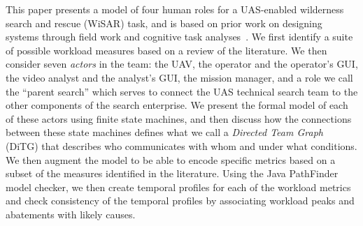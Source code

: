 This paper presents a model of four human roles for a UAS-enabled wilderness search and rescue (WiSAR) task, and is based on prior work on designing systems through field work and cognitive task analyses~\cite{Adams2008,GoodrichMorse2008}.  We first identify a suite of possible workload measures based on a review of the literature.  We then consider seven {\em actors} in the team: the UAV, the operator and the operator's GUI, the video analyst and the analyst's GUI, the mission manager, and a role we call the ``parent search'' which serves to connect the UAS technical search team to the other components of the search enterprise.  We present the formal model of each of these actors using finite state machines, and then discuss how the connections between these state machines defines what we call a {\em Directed Team Graph} (DiTG) that describes who communicates with whom and under what conditions.  We then augment the model to be able to encode specific metrics based on a subset of the measures identified in the literature.  Using the Java PathFinder model checker, we then create temporal profiles for each of the workload metrics and check consistency of the temporal profiles by associating workload peaks and abatements with likely causes. 

